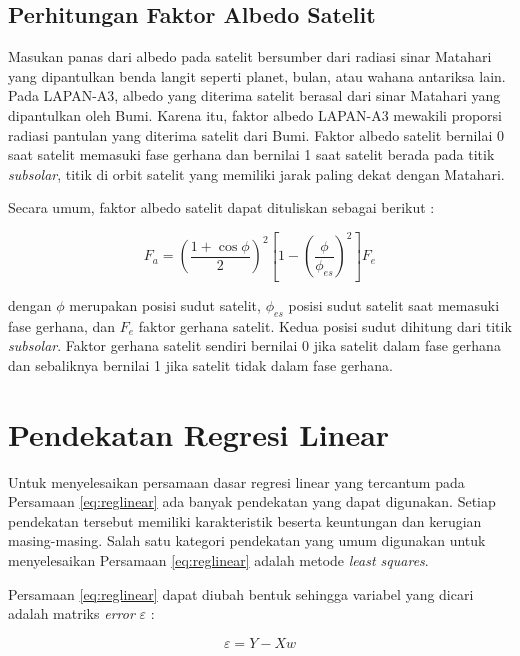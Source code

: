 \subsection{Perhitungan Faktor Albedo Satelit}

Masukan panas dari albedo pada satelit bersumber dari radiasi sinar Matahari
yang dipantulkan benda langit seperti planet, bulan, atau wahana antariksa
lain. Pada LAPAN-A3, albedo yang diterima satelit berasal dari sinar Matahari
yang dipantulkan oleh Bumi. Karena itu, faktor albedo LAPAN-A3 mewakili
proporsi radiasi pantulan yang diterima satelit dari Bumi. Faktor albedo
satelit bernilai 0 saat satelit memasuki fase gerhana dan bernilai 1 saat
satelit berada pada titik \textit{subsolar}, titik di orbit satelit yang
memiliki jarak paling dekat dengan Matahari. 

Secara umum, faktor albedo satelit dapat dituliskan sebagai berikut :

\begin{equation}
\label{eq:albedofactor}
F_a = \left( \frac{1 + \cos{\phi}}{2} \right)^2 \left[ 1 - \left( \frac{\phi}{\phi_{es}} \right)^2 \right] F_e
\end{equation}

dengan $\phi$ merupakan posisi sudut satelit, $\phi_{es}$ posisi sudut satelit
saat memasuki fase gerhana, dan $F_e$ faktor gerhana satelit. Kedua posisi
sudut dihitung dari titik \textit{subsolar}. Faktor gerhana satelit sendiri
bernilai 0 jika satelit dalam fase gerhana dan sebaliknya bernilai 1 jika
satelit tidak dalam fase gerhana.

\section{Pendekatan Regresi Linear}

Untuk menyelesaikan persamaan dasar regresi linear yang tercantum pada
Persamaan \ref{eq:reglinear} ada banyak pendekatan yang dapat digunakan. Setiap
pendekatan tersebut memiliki karakteristik beserta keuntungan dan kerugian
masing-masing. Salah satu kategori pendekatan yang umum digunakan untuk
menyelesaikan Persamaan \ref{eq:reglinear} adalah metode \textit{least
squares}. 

Persamaan \ref{eq:reglinear} dapat diubah bentuk sehingga variabel yang dicari adalah matriks \textit{error} $\varepsilon$ :

\begin{equation}
\label{eq:errorreglinear}
\varepsilon = Y - Xw
\end{equation}

